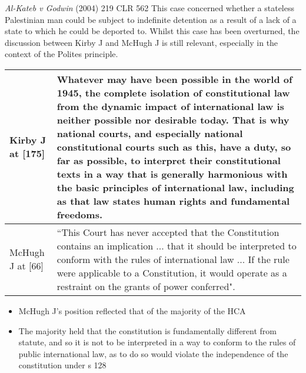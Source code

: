 \begin{casedetails}{\textit{Al-Kateb v Godwin} (2004) 219 CLR 562}\label{case:Al-Kateb v Godwin}
    \flushleft
    This case concerned whether a stateless Palestinian man could be subject to indefinite detention as a result of a lack of a state to which he could be deported to. Whilst this case has been overturned, the discussion between Kirby J and McHugh J is still relevant, especially in the context of the Polites principle.

    \begin{longtable}{p{}|>{\raggedright\arraybackslash}p{}}
        Kirby J at [175] & Whatever may have been possible in the world of 1945, the complete isolation of constitutional law from the dynamic impact of international law is neither possible nor desirable today. That is why national courts, and especially national constitutional courts such as this, have a duty, so far as possible, to interpret their constitutional texts in a way that is generally harmonious with the basic principles of international law, including as that law states human rights and fundamental freedoms. \\[3cm]\hline
        McHugh J at [66] & ``This Court has never accepted that the Constitution contains an implication ... that it should be interpreted to conform with the rules of international law ... If the rule were applicable to a Constitution, it would operate as a restraint on the grants of power conferred".
    \end{longtable}  
\end{casedetails}

\begin{itemize}
    \item McHugh J's position reflected that of the majority of the HCA
    \item The majority held that the constitution is fundamentally different from statute, and so it is not to be interpreted in a way to conform to the rules of public international law, as to do so would violate the independence of the constitution under s 128
\end{itemize}

